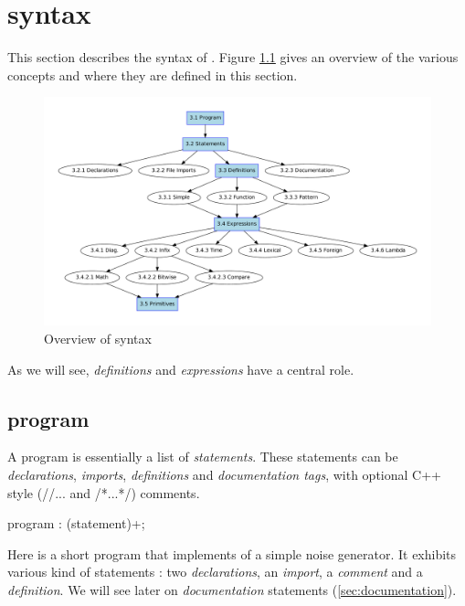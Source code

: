 \chapter{\faust syntax}

This section describes the syntax of \faust. Figure \ref{fig:syntax} gives an overview of the various concepts and where they are defined in this section. 
\begin{figure}[ht!]
\centering
\includegraphics[scale=0.45]{illustrations/syntax-chart}
\caption{Overview of \faust syntax}
\label{fig:syntax}
\end{figure}

As we will see, \textit{definitions} and \textit{expressions} have a central role.

\section{\faust program}

A \faust program is essentially a list of \textit{statements}. These statements can be \textit{declarations}, \textit{imports}, \textit{definitions} and \textit{documentation tags}, with optional C++ style (//... and /*...*/) comments.
 
\begin{rail}
program : (statement)+;
\end{rail}

Here is a short \faust program that implements of a simple noise generator. It exhibits various kind of statements : two \textit{declarations}, an \textit{import}, a \textit{comment} and a \textit{definition}. We will see later on \textit{documentation} statements (\ref{sec:documentation}).

